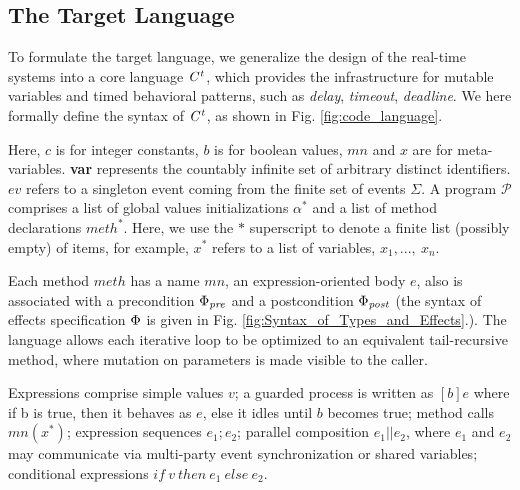 \documentclass[acmsmall,10pt,review]{acmart}
\newcommand{\effect}{\textcolor{black}{\ensuremath{\mathrm{\Phi}}}}
\newcommand{\anyevent}[1]{{\textcolor{darkred}
{{\textbf{\footnotesize #1}}}}}
\newcommand{\code}[1]{{\tt{\ensuremath{\m{#1}}}}}
\newcommand{\m}{\mathit}
\newcommand\figref[1]{Fig. \textcolor{black}{\ref{#1}}.}
\newcommand{\timedL}{\code{C^{t}}}
\begin{document}
{\subsection{The Target Language}
\label{subsec:Targetlanguage}

To formulate the target language, we generalize the design of the real-time systems
 into a core language \code{\timedL}, 
 which provides the infrastructure for mutable variables and timed behavioral patterns, 
 such as \emph{delay}, \emph{timeout}, \emph{deadline}. 
We here formally define the syntax of \code{\timedL}, as shown in \figref{fig:code_language} 


Here, \code{c} is for integer constants, \code{b} is for boolean values, 
 \code{mn} and \code{x} are for meta-variables.  
 \textbf{var} represents the countably infinite set of arbitrary distinct identifiers. 
\code{ev} refers to a singleton event coming from the finite 
set of events \code{\Sigma}. 
A program \code{\mathcal{P}} comprises a list of 
global values initializations \code{\alpha^*} and 
a list of 
method declarations \code{{meth^*}}. 
Here, we use the \code{*} superscript to denote a finite list (possibly empty) of items, for example, \code{{x^*}} refers to a list of variables, \code{x_1, ...,\ x_n}. 


Each method \code{meth} has a name \code{mn}, an expression-oriented body \code{e}, also is associated with a precondition  \code{\effect_{pre}} and a postcondition \code{\effect_{post}} (the syntax of effects specification \code{\effect} is given in \figref{fig:Syntax_of_Types_and_Effects}).
The language allows each iterative loop to be optimized to an equivalent 
tail-recursive method, where mutation on parameters is made visible 
to the caller. 

Expressions comprise simple values \code{v};
a guarded process is written as \code{[b]e} where if b is true, 
then it behaves as \code{e}, else it idles until \code{b} becomes true; 
method calls \code{mn({x^*})}; 
expression sequences \code{e_1;e_2};
parallel composition \code{e_1 || e_2}, where \code{e_1} and \code{e_2} 
may communicate via multi-party event synchronization or shared variables; 
conditional expressions \code{{if}\ v\ {then}\ e_1\ {else}\ e_2}. 

}
\end{document}
